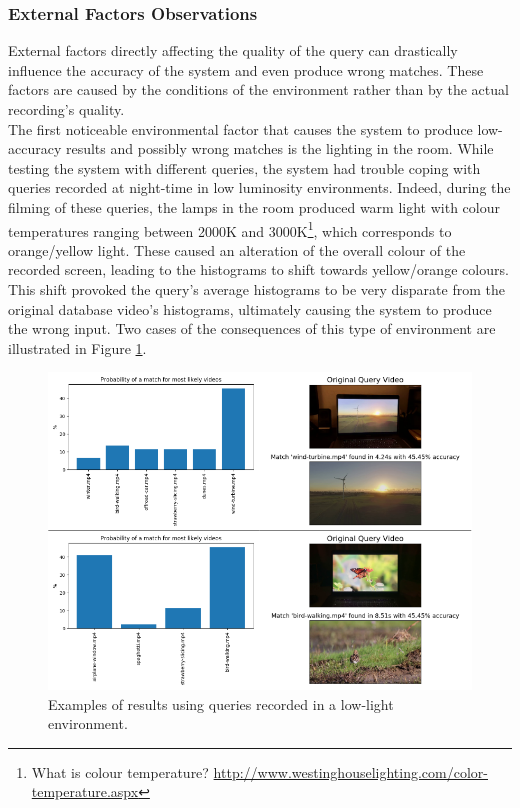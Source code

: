 
\subsubsection{External Factors Observations}
\label{sec:evaluation-observations-online-phase}

External factors directly affecting the quality of the query can drastically influence the accuracy of the system and even produce wrong matches. These factors are caused by the conditions of the environment rather than by the actual recording's quality.\\

The first noticeable environmental factor that causes the system to produce low-accuracy results and possibly wrong matches is the lighting in the room. While testing the system with different queries, the system had trouble coping with queries recorded at night-time in low luminosity environments. Indeed, during the filming of these queries, the lamps in the room produced warm light with colour temperatures ranging between 2000K and 3000K\footnote{What is colour temperature? \url{http://www.westinghouselighting.com/color-temperature.aspx}}, which corresponds to orange/yellow light. These caused an alteration of the overall colour of the recorded screen, leading to the histograms to shift towards yellow/orange colours. This shift provoked the query's average histograms to be very disparate from the original database video's histograms, ultimately causing the system to produce the wrong input. Two cases of the consequences of this type of environment are illustrated in Figure \ref{fig:evaluation-yellow-light-queries}.\\ %

\begin{figure}[h] 
\centerline{\includegraphics[width=\textwidth]{figures/evaluation/yellow-light-queries.png}}
\caption{\label{fig:evaluation-yellow-light-queries}Examples of results using queries recorded in a low-light environment.}
\end{figure}

